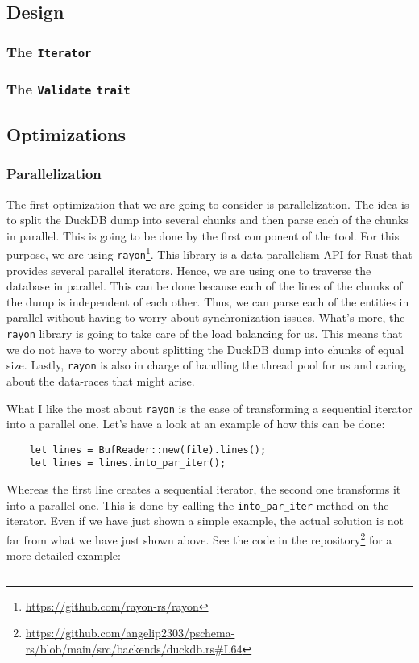 \subsection{Design}

\subsubsection{The \texttt{Iterator}}

\subsubsection{The \texttt{Validate} \texttt{trait}}

\subsection{Optimizations}

\subsubsection{Parallelization}

The first optimization that we are going to consider is parallelization. The idea is to split the DuckDB dump into several chunks and then parse each of the chunks in parallel. This is going to be done by the first component of the tool. For this purpose, we are using \texttt{rayon}\footnote{\url{https://github.com/rayon-rs/rayon}}. This library is a data-parallelism API for Rust that provides several parallel iterators. Hence, we are using one to traverse the database in parallel. This can be done because each of the lines of the chunks of the dump is independent of each other. Thus, we can parse each of the entities in parallel without having to worry about synchronization issues. What's more, the \texttt{rayon} library is going to take care of the load balancing for us. This means that we do not have to worry about splitting the DuckDB dump into chunks of equal size. Lastly, \texttt{rayon} is also in charge of handling the thread pool for us and caring about the data-races that might arise.

What I like the most about \texttt{rayon} is the ease of transforming a sequential iterator into a parallel one. Let's have a look at an example of how this can be done:

\begin{verbatim}
    let lines = BufReader::new(file).lines();
    let lines = lines.into_par_iter();
\end{verbatim}

Whereas the first line creates a sequential iterator, the second one transforms it into a parallel one. This is done by calling the \texttt{into\_par\_iter} method on the iterator. Even if we have just shown a simple example, the actual solution is not far from what we have just shown above. See the code in the repository\footnote{\url{https://github.com/angelip2303/pschema-rs/blob/main/src/backends/duckdb.rs\#L64}} for a more detailed example:

\begin{code}
    \inputminted{rust}{code/listings/11-2_duckdb.rs}
\end{code}